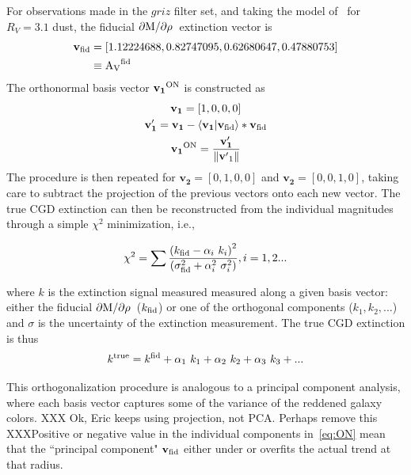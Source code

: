 \documentclass[11pt, oneside]{article}   	%
\newcommand{\dMinline}{$\rm \partial M / \partial \rho$}
\begin{document}
For observations made in the $griz$ filter set, and taking the model of~\cite{fitzpatrick1999correcting} for $R_V = 3.1$ dust, the fiducial \dMinline~extinction vector is
\begin{align*}
\mathbf{v_{\rm fid}} &= \left[ 1.12224688, 0.82747095, 0.62680647, 0.47880753 \right ] \label{eq:fid}\\
&\equiv {\rm A_V}^{\rm fid}
\end{align*}
The orthonormal basis vector $\mathbf{v_1}^{\rm ON}$ is constructed as 
\begin{gather}
    \mathbf{v_1} = \left [ 1, 0, 0, 0 \right ] \\
    \mathbf{v'_1} = \mathbf{v_1} - \langle \mathbf{v_1} | \mathbf{v_{\rm fid}}\rangle \ast \mathbf{v}_{\rm fid}\\
     \mathbf{v_1}^{\rm ON} =  \frac{\mathbf{v'_1}} { \left\| \mathbf{v'}_1 \right\| }\label{eq:ON}
\end{gather}
The procedure is then repeated for $\mathbf{v_2} = \left [ 0, 1, 0, 0 \right ]$ and $\mathbf{v_2}=\left [ 0, 0, 1, 0 \right ]$, taking care to subtract the projection of the previous vectors onto each new vector. 
The true CGD extinction can then be reconstructed from the individual magnitudes %
through a simple $\chi^2$ minimization, i.e.,

\begin{equation}
\chi^2 = \sum \frac{\left ( k_{\rm fid} - \alpha_i \  k_i \right )^2}{\left ( \sigma^2_{\rm fid} + \alpha^2_i \ \sigma^2_i \right )}, i = 1,2...
\end{equation} 

where $k$ is the extinction signal measured measured along a given basis vector: either the fiducial \dMinline~($k_{\rm fid}$) or one of the orthogonal components ($k_1, k_2, ...$) and $\sigma$ is the uncertainty of the extinction measurement. The true CGD extinction is thus
\begin{equation}
k^{\rm true} = k^{\rm fid} + \alpha_1 \ k_1 + \alpha_2 \ k_2 + \alpha_3 \ k_3 + ...
\end{equation}


This orthogonalization procedure is analogous to a principal component analysis, where each basis vector captures some of the variance of the reddened galaxy colors. XXX Ok, Eric keeps using projection, not PCA. Perhaps remove this XXXPositive or negative value in the individual components in~\ref{eq:ON} mean that the ``principal component" $\mathbf{v}_{\rm fid}$ either under or overfits the actual trend at that radius. 
\end{document}
